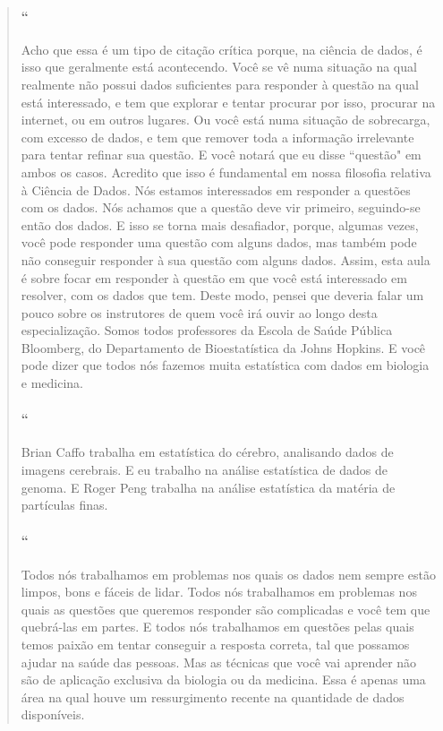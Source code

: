 \begin{quotation}
\begin{small}
\paragraph{``}
Acho que essa é um tipo de citação crítica porque, na ciência de dados, é isso que geralmente está acontecendo. Você se vê numa situação na qual realmente não possui dados suficientes para responder à questão na qual está interessado, e tem que explorar e tentar procurar por isso, procurar na internet, ou em outros lugares. Ou você está numa situação de sobrecarga, com excesso de dados, e tem que remover toda a informação irrelevante para tentar refinar sua questão. E você notará que eu disse ``questão" em ambos os casos. Acredito que isso é fundamental em nossa filosofia relativa à Ciência de Dados. Nós estamos interessados em responder a questões com os dados. Nós achamos que a questão deve vir primeiro, seguindo-se então dos dados. E isso se torna mais desafiador, porque, algumas vezes, você pode responder uma questão com alguns dados, mas também pode não conseguir responder à sua questão com alguns dados. Assim, esta aula é sobre focar em responder à questão em que você está interessado em resolver, com os dados que tem. Deste modo, pensei que deveria falar um pouco sobre os instrutores de quem você irá ouvir ao longo desta especialização. Somos todos professores da Escola de Saúde Pública Bloomberg,  do Departamento de Bioestatística da Johns Hopkins. E você pode dizer que todos nós fazemos muita estatística com dados em biologia e medicina.

\paragraph{``}
Brian Caffo trabalha em estatística do cérebro, analisando dados de imagens cerebrais. E eu trabalho na análise estatística de dados de genoma. E Roger Peng trabalha na análise estatística da matéria de partículas finas.

\paragraph{``}
Todos nós trabalhamos em problemas nos quais os dados nem sempre estão limpos, bons e fáceis de lidar. Todos nós trabalhamos em problemas nos quais as questões que queremos responder são complicadas e você tem que quebrá-las em partes. E todos nós trabalhamos em questões pelas quais temos paixão em tentar conseguir a resposta correta, tal que possamos ajudar na saúde das pessoas. Mas as técnicas que você vai aprender não são de aplicação exclusiva da biologia ou da medicina. Essa é apenas uma área na qual houve um ressurgimento recente na quantidade de dados disponíveis.


\end{small}
\end{quotation}

